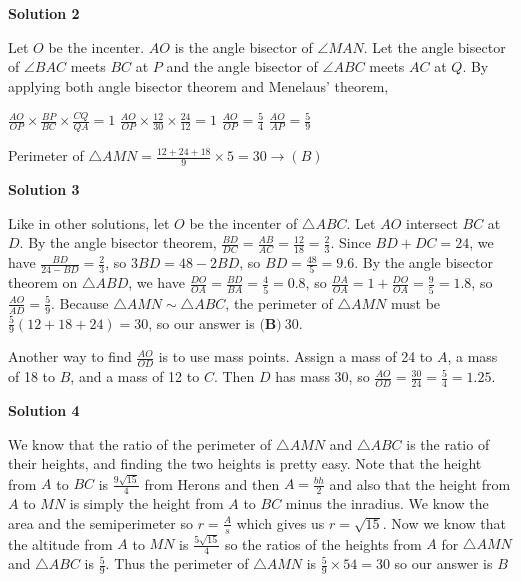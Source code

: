 \begin{enumerate}
\textbf{Solution 2}

Let $O$ be the incenter. $AO$ is the angle bisector of $\angle MAN$. Let the angle bisector of $\angle BAC$ meets $BC$ at $P$ and the angle bisector of $\angle ABC$ meets $AC$ at $Q$. By applying both angle bisector theorem and Menelaus' theorem,

 


 $\frac{AO}{OP} \times \frac{BP}{BC} \times \frac{CQ}{QA} = 1$
$\frac{AO}{OP} \times \frac{12}{30} \times \frac{24}{12} = 1$
$\frac{AO}{OP}=\frac{5}{4}$
$\frac{AO}{AP}=\frac{5}{9}$

 
Perimeter of $\triangle AMN = \frac{12+24+18}{9} \times 5 = 30  \rightarrow \boxed{(B)}$




\textbf{Solution 3}

Like in other solutions, let $O$ be the incenter of $\triangle ABC$. Let $AO$ intersect $BC$ at $D$. By the angle bisector theorem, $\frac{BD}{DC} = \frac{AB}{AC} = \frac{12}{18} = \frac{2}{3}$. Since $BD+DC = 24$, we have $\frac{BD}{24-BD} = \frac{2}{3}$, so $3BD = 48 - 2BD$, so $BD = \frac{48}{5} = 9.6$. By the angle bisector theorem on $\triangle ABD$, we have $\frac{DO}{OA} = \frac{BD}{BA} = \frac{4}{5} = 0.8$, so $\frac{DA}{OA} = 1 + \frac{DO}{OA} = \frac{9}{5} = 1.8$, so $\frac{AO}{AD} = \frac{5}{9}$. Because $\triangle AMN \sim \triangle ABC$, the perimeter of $\triangle AMN$ must be $\frac{5}{9} (12 + 18 + 24) = 30$, so our answer is $\boxed{\textbf{(B)}\ 30}$.

 Another way to find $\frac{AO}{OD}$ is to use mass points. Assign a mass of 24 to $A$, a mass of 18 to $B$, and a mass of 12 to $C$. Then $D$ has mass 30, so $\frac{AO}{OD} = \frac{30}{24} = \frac{5}{4} = 1.25$.

 



\textbf{Solution 4}

We know that the ratio of the perimeter of $\triangle AMN$ and $\triangle ABC$ is the ratio of their heights, and finding the two heights is pretty easy. Note that the height from $A$ to $BC$ is $\frac{9\sqrt{15}}{4}$ from Herons and then $A=\frac{bh}{2}$ and also that the height from $A$ to $MN$ is simply the height from $A$ to $BC$ minus the inradius. We know the area and the semiperimeter so $r=\frac{A}{s}$ which gives us $r=\sqrt{15}$. Now we know that the altitude from $A$ to $MN$ is $\frac{5\sqrt{15}}{4}$ so the ratios of the heights from $A$ for $\triangle AMN$ and $\triangle ABC$ is $\frac{5}{9}$. Thus the perimeter of $\triangle AMN$ is $\frac{5}{9} \times 54 = 30$ so our answer is $\boxed{B}$


\end{enumerate}
